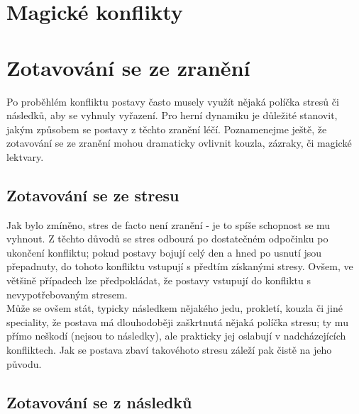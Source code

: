 \documentclass[../main.tex]{subfiles}
\begin{document}
\section{Magické konflikty}
\label{sec:magicke-konflikty}

\section{Zotavování se ze zranění}
\label{sec:zotavovanise}

Po proběhlém konfliktu postavy často musely využít nějaká políčka stresů či následků, aby se vyhnuly vyřazení. Pro herní dynamiku je důležité stanovit, jakým způsobem se postavy z těchto zranění léčí. Poznamenejme ještě, že zotavování se ze zranění mohou dramaticky ovlivnit kouzla, zázraky, či magické lektvary.

\subsection{Zotavování se ze stresu}
\label{sec:zot-stresy}

Jak bylo zmíněno, stres de facto není zranění - je to spíše schopnost se mu vyhnout. Z těchto důvodů se stres odbourá po dostatečném odpočinku po ukončení konfliktu; pokud postavy bojují celý den a hned po usnutí jsou přepadnuty, do tohoto konfliktu vstupují s předtím získanými stresy. Ovšem, ve většině případech lze předpokládat, že postavy vstupují do konfliktu s nevypotřebovaným stresem. \\
Může se ovšem stát, typicky následkem nějakého jedu, prokletí, kouzla či jiné speciality, že postava má dlouhodoběji zaškrtnutá nějaká políčka stresu; ty mu přímo neškodí (nejsou to následky), ale prakticky jej oslabují v nadcházejících konfliktech. Jak se postava zbaví takovéhoto stresu záleží pak čistě na jeho původu.

\subsection{Zotavování se z následků}
\label{sec:zot-nasledky}
\end{document}
